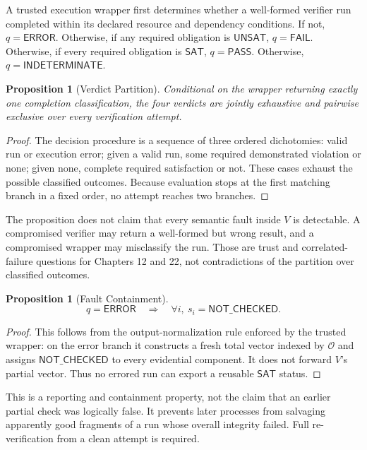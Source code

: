 \documentclass[11pt,openany]{book}
\newtheorem{proposition}[definition]{Proposition}
\newcommand{\Pass}{\mathsf{PASS}}
\newcommand{\Fail}{\mathsf{FAIL}}
\newcommand{\Indeterminate}{\mathsf{INDETERMINATE}}
\newcommand{\ErrorVerdict}{\mathsf{ERROR}}
\begin{document}
A trusted execution wrapper first determines whether a well-formed verifier
run completed within its declared resource and dependency conditions. If not,
\(q=\ErrorVerdict\). Otherwise, if any required obligation is
\(\mathsf{UNSAT}\), \(q=\Fail\). Otherwise, if every required obligation is
\(\mathsf{SAT}\), \(q=\Pass\). Otherwise, \(q=\Indeterminate\).

\begin{proposition}[Verdict Partition]
Conditional on the wrapper returning exactly one completion classification,
the four verdicts are jointly exhaustive and pairwise exclusive over every
verification attempt.
\end{proposition}

\begin{proof}
The decision procedure is a sequence of three ordered dichotomies: valid run or
execution error; given a valid run, some required demonstrated violation or
none; given none, complete required satisfaction or not. These cases exhaust
the possible classified outcomes. Because evaluation stops at the first
matching branch in a fixed order, no attempt reaches two branches.
\end{proof}

The proposition does not claim that every semantic fault inside \(V\) is
detectable. A compromised verifier may return a well-formed but wrong result,
and a compromised wrapper may misclassify the run. Those are trust and
correlated-failure questions for Chapters 12 and 22, not contradictions of the
partition over classified outcomes.

\begin{proposition}[Fault Containment]
\[
 q=\ErrorVerdict\quad\Longrightarrow\quad
 \forall i,\ s_i=\mathsf{NOT\_CHECKED}.
\]
\end{proposition}

\begin{proof}
This follows from the output-normalization rule enforced by the trusted
wrapper: on the error branch it constructs a fresh total vector indexed by
\(\mathcal O\) and assigns \(\mathsf{NOT\_CHECKED}\) to every evidential
component. It does not forward \(V\)'s partial vector. Thus no errored run can
export a reusable \(\mathsf{SAT}\) status.
\end{proof}

This is a reporting and containment property, not the claim that an earlier
partial check was logically false. It prevents later processes from salvaging
apparently good fragments of a run whose overall integrity failed. Full
re-verification from a clean attempt is required.
\end{document}
